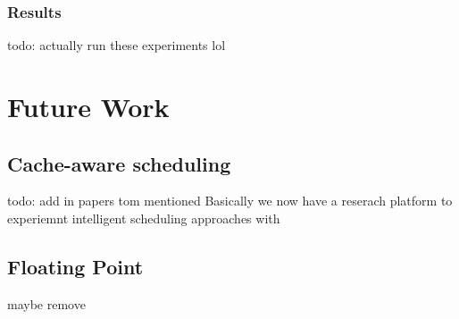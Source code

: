 \documentclass[bsc,frontabs,twoside,singlespacing,parskip,deptreport]{infthesis}     %
\begin{document}
\subsection{Results}
todo: actually run these experiments lol

\chapter{Future Work} \label{future-work}
\section{Cache-aware scheduling}
todo: add in papers tom mentioned
Basically we now have a reserach platform to experiemnt intelligent scheduling approaches with

\section{Floating Point}
maybe remove




\end{document}
